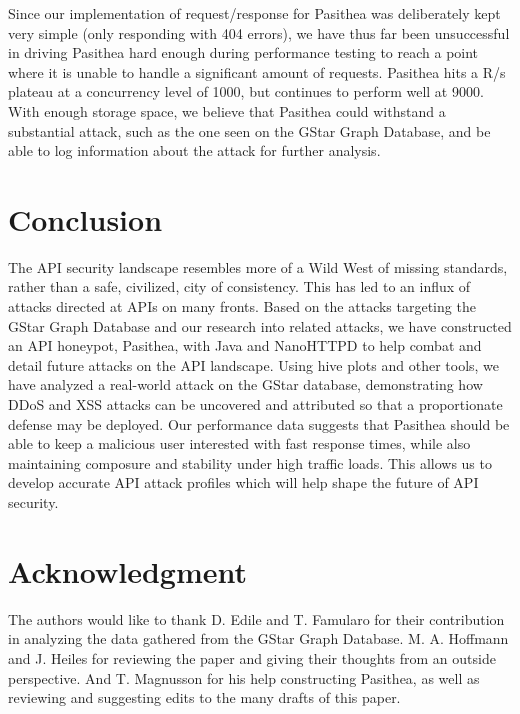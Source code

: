 Since our implementation of request/response for Pasithea was deliberately kept very simple (only responding with 404 errors), we have thus far been unsuccessful in driving Pasithea hard enough during performance testing to reach a point where it is unable to handle a significant amount of requests.  Pasithea hits a R/s plateau at a concurrency level of 1000, but continues to perform well at 9000. With enough storage space, we believe that Pasithea could withstand a substantial attack, such as the one seen on the GStar Graph Database, and be able to log information about the attack for further analysis.

\section{Conclusion}
\label{conclusion}
The API security landscape resembles more of a Wild West of missing standards, rather than a safe, civilized, city of consistency. This has led to an influx of attacks directed at APIs on many  fronts. Based on the attacks targeting the GStar Graph Database and our research into related attacks, we have constructed an API honeypot, Pasithea, with Java and NanoHTTPD to help combat and detail future attacks on the API landscape. Using hive plots and other tools, we have analyzed a real-world attack on the GStar database, demonstrating how DDoS and XSS attacks can be uncovered and attributed so that a proportionate defense may be deployed.  Our performance data suggests that Pasithea should be able to keep a malicious user interested with fast response times, while also maintaining composure and stability under high traffic loads. This allows us to develop accurate API attack profiles which will help shape the future of API security.

\section*{Acknowledgment}
\label{Acknowledgements}
The authors would like to thank D. Edile and T. Famularo for their contribution in analyzing the data gathered from the GStar Graph Database.  M. A. Hoffmann and J. Heiles for reviewing the paper and giving their thoughts from an outside perspective. And T. Magnusson for his help constructing Pasithea, as well as reviewing and suggesting edits to the many drafts of this paper.


\ifCLASSOPTIONcaptionsoff
  \newpage
\fi


